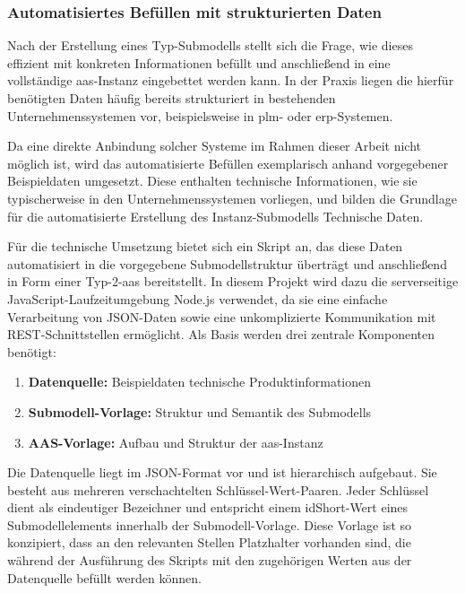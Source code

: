 \subsubsection{Automatisiertes Befüllen mit strukturierten Daten}
Nach der Erstellung eines Typ-Submodells stellt sich die Frage, wie dieses effizient mit konkreten Informationen befüllt und anschließend in eine vollständige \acs{aas}-Instanz eingebettet werden kann.
In der Praxis liegen die hierfür benötigten Daten häufig bereits strukturiert in bestehenden Unternehmenssystemen vor, beispielsweise in \acs{plm}- oder \acs{erp}-Systemen.

Da eine direkte Anbindung solcher Systeme im Rahmen dieser Arbeit nicht möglich ist, wird das automatisierte Befüllen exemplarisch anhand vorgegebener Beispieldaten umgesetzt.
Diese enthalten technische Informationen, wie sie typischerweise in den Unternehmenssystemen vorliegen, und bilden die Grundlage für die automatisierte Erstellung des Instanz-Submodells Technische Daten.

Für die technische Umsetzung bietet sich ein Skript an, das diese Daten automatisiert in die vorgegebene Submodellstruktur überträgt und anschließend in Form einer Typ-2-\acs{aas} bereitstellt.
In diesem Projekt wird dazu die serverseitige JavaScript-Laufzeitumgebung Node.js \cite{nodejs} verwendet, da sie eine einfache Verarbeitung von JSON-Daten sowie eine unkomplizierte Kommunikation mit REST-Schnittstellen ermöglicht. 
Als Basis werden drei zentrale Komponenten benötigt:

\begin{enumerate}[noitemsep, leftmargin=*, label=\textbf{\arabic*.}]
    \item \textbf{Datenquelle:} Beispieldaten technische Produktinformationen
    \item \textbf{Submodell-Vorlage:} Struktur und Semantik des Submodells
    \item \textbf{AAS-Vorlage:} Aufbau und Struktur der \acs{aas}-Instanz
\end{enumerate}

Die Datenquelle liegt im JSON-Format vor und ist hierarchisch aufgebaut.
Sie besteht aus mehreren verschachtelten Schlüssel-Wert-Paaren.
Jeder Schlüssel dient als eindeutiger Bezeichner und entspricht einem idShort-Wert eines Submodellelements innerhalb der Submodell-Vorlage.
Diese Vorlage ist so konzipiert, dass an den relevanten Stellen Platzhalter vorhanden sind, die während der Ausführung des Skripts mit den zugehörigen Werten aus der Datenquelle befüllt werden können.

